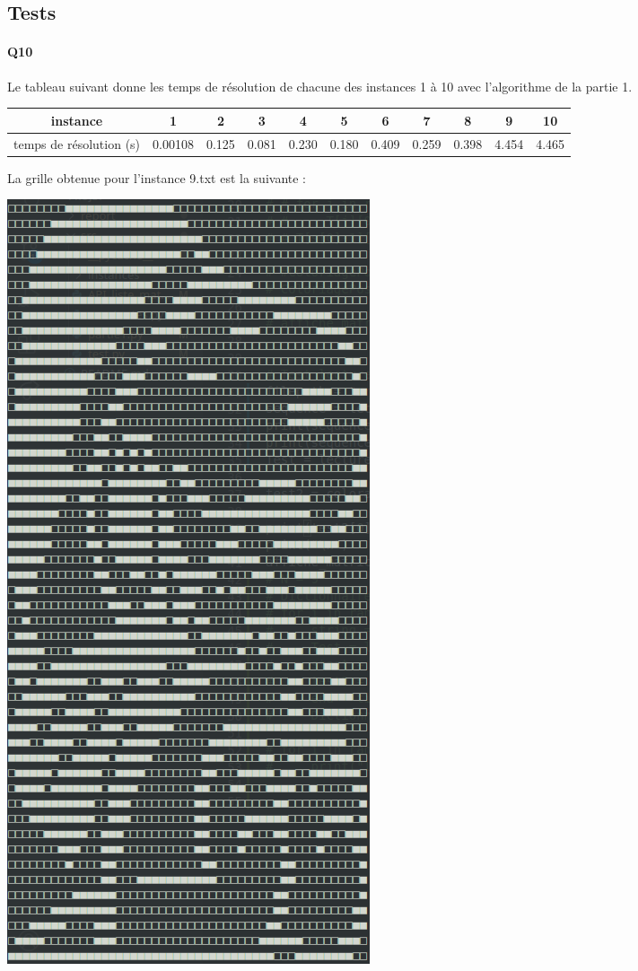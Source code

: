 \documentclass[12pt]{article}
\begin{document}
		\subsection{Tests}
		
			\paragraph{Q10}
				Le tableau suivant donne les temps de résolution de chacune des instances 1 à 10 avec l'algorithme de la partie 1.
				\begin{center}
					\begin{tabular}{|c|c|c|c|c|c|c|c|c|c|c| }
						\hline
						instance & 1 & 2 & 3 & 4 & 5 & 6 & 7 & 8 & 9 & 10 \\ \hline
						temps de résolution (s) & 0.00108 & 0.125 & 0.081 & 0.230 & 0.180 & 0.409 & 0.259 & 0.398 & 4.454 & 4.465 \\ \hline
					\end{tabular}
				\end{center}
				
				La grille obtenue pour l'instance 9.txt est la suivante :
				\begin{center}
					\includegraphics[scale=0.242]{instance9.png}
				\end{center}
			
\end{document}
